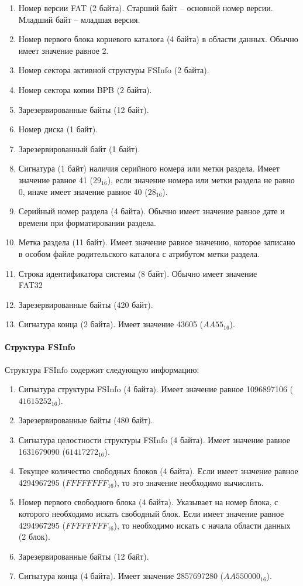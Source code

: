 \begin{enumerate}
\item Номер версии FAT (2 байта). Старший байт -- основной номер версии. Младший байт -- младшая версия. 
\item Номер первого блока корневого каталога (4 байта) в области данных. Обычно имеет значение равное 2.
\item Номер сектора активной структуры FSInfo (2 байта). 
\item Номер сектора копии BPB (2 байта).
\item Зарезервированные байты (12 байт).
\item Номер диска (1 байт).
\item Зарезервированный байт (1 байт).
\item Сигнатура (1 байт) наличия серийного номера или метки раздела. Имеет значение равное 41 ($29_{16}$), если значение номера или метки раздела не равно 0, иначе имеет значение равное 40 ($28_{16}$).
\item Серийный номер раздела (4 байта). Обычно имеет значение равное дате и времени при форматировании раздела.
\item Метка раздела (11 байт). Имеет значение равное значению, которое записано в особом файле родительского каталога с атрибутом метки раздела.
\item Строка идентификатора системы (8 байт). Обычно имеет значение \textquotedbl FAT32~~~\textquotedbl\
\item Зарезервированные байты (420 байт).
\item Сигнатура конца (2 байта). Имеет значение 43605 ($AA55_{16}$).
\end{enumerate}

\paragraph{Структура FSInfo}

Структура FSInfo содержит следующую информацию:

\begin{enumerate}
\item Сигнатура структуры FSInfo (4 байта). Имеет значение равное 1096897106 ($41615252_{16}$).
\item Зарезервированные байты (480 байт).
\item Сигнатура целостности структуры FSInfo (4 байта). Имеет значение равное 1631679090 ($61417272_{16}$).
\item Текущее количество свободных блоков (4 байта). Если имеет значение равное 4294967295 ($FFFFFFFF_{16}$), то это значение необходимо вычислить.
\item Номер первого свободного блока (4 байта). Указывает на номер блока, с которого необходимо искать свободный блок. Если имеет значение равное 4294967295 ($FFFFFFFF_{16}$), то необходимо искать с начала области данных (2 блок).
\item Зарезервированные байты (12 байт).
\item Сигнатура конца (4 байта). Имеет значение 2857697280 ($AA550000_{16}$).
\end{enumerate}

